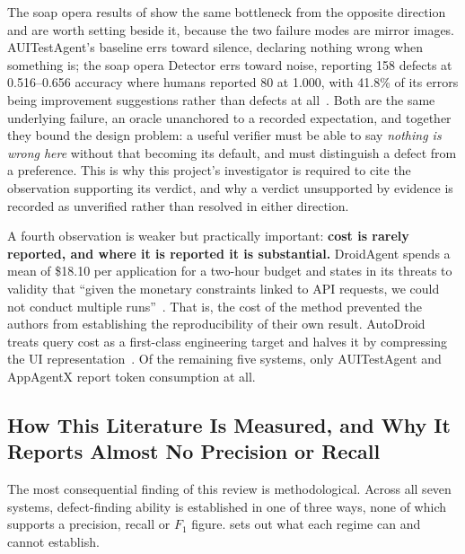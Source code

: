 The soap opera results of  show the same bottleneck from
the opposite direction and are worth setting beside it, because the two failure
modes are mirror images. AUITestAgent's baseline errs toward silence, declaring
nothing wrong when something is; the soap opera Detector errs toward noise,
reporting 158 defects at 0.516--0.656 accuracy where humans reported 80 at
1.000, with 41.8\% of its errors being improvement suggestions rather than
defects at all~\cite{soapopera}. Both are the same underlying failure, an
oracle unanchored to a recorded expectation, and together they bound the design
problem: a useful verifier must be able to say \emph{nothing is wrong here}
without that becoming its default, and must distinguish a defect from a
preference. This is why this project's investigator is required to cite the
observation supporting its verdict, and why a verdict unsupported by evidence
is recorded as unverified rather than resolved in either direction.

A fourth observation is weaker but practically important: \textbf{cost is
rarely reported, and where it is reported it is substantial.} DroidAgent spends
a mean of \$18.10 per application for a two-hour budget and states in its
threats to validity that ``given the monetary constraints linked to API
requests, we could not conduct multiple runs''~\cite{droidagent}. That is, the
cost of the method prevented the authors from establishing the reproducibility
of their own result. AutoDroid treats query cost as a first-class engineering
target and halves it by compressing the UI representation~\cite{autodroid}. Of
the remaining five systems, only AUITestAgent and AppAgentX report token
consumption at all.

\subsection{How This Literature Is Measured, and Why It Reports Almost No Precision or Recall}
\label{subsec:measurement}

The most consequential finding of this review is methodological. Across all
seven systems, defect-finding ability is established in one of three ways, none
of which supports a precision, recall or $F_1$ figure.
 sets out what each regime can and cannot establish.

